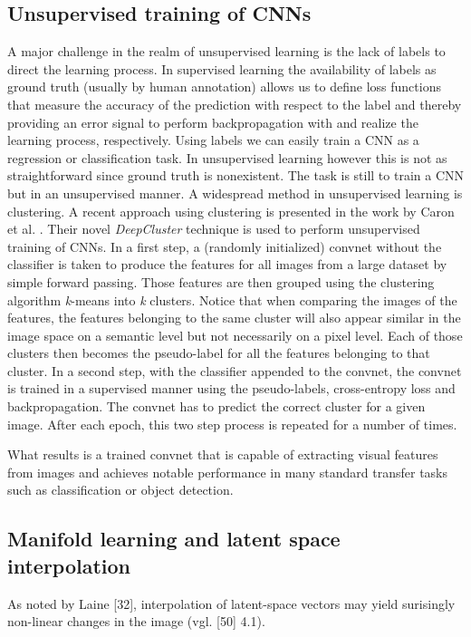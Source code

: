 \documentclass[12pt,a4paper]{article}
\begin{document}


\subsection{Unsupervised training of CNNs}\label{subsec:deepcluster}
A major challenge in the realm of unsupervised learning is the lack of labels to direct the learning process. In supervised learning the availability of labels as ground truth (usually by human annotation) allows us to define loss functions that measure the accuracy of the prediction with respect to the label and thereby providing an error signal to perform backpropagation with and realize the learning process, respectively. Using labels we can easily train a CNN as a regression or classification task. In unsupervised learning however this is not as straightforward since ground truth is nonexistent. The task is still to train a CNN but in an unsupervised manner. A widespread method in unsupervised learning is clustering. A recent approach using clustering is presented in the work by Caron et al. \cite{DeepCluster}. Their novel \textit{DeepCluster} technique is used to perform unsupervised training of CNNs. In a first step, a (randomly initialized) convnet without the classifier is taken to produce the features for all images from a large dataset by simple forward passing. Those features are then grouped using the clustering algorithm \textit{k}-means into \textit{k} clusters. Notice that when comparing the images of the features, the features belonging to the same cluster will also appear similar in the image space on a semantic level but not necessarily on a pixel level. Each of those clusters then becomes the pseudo-label for all the features belonging to that cluster. In a second step, with the classifier appended to the convnet, the convnet is trained in a supervised manner using the pseudo-labels, cross-entropy loss and backpropagation. The convnet has to predict the correct cluster for a given image. After each epoch, this two step process is repeated for a number of times. 
\par What results is a trained convnet that is capable of extracting visual features from images and achieves notable performance in many standard transfer tasks such as classification or object detection.


\subsection{Manifold learning and latent space interpolation}
As noted by Laine [32], interpolation of latent-space vectors may yield surisingly non-linear changes in the image (vgl. [50] 4.1).
\end{document}
